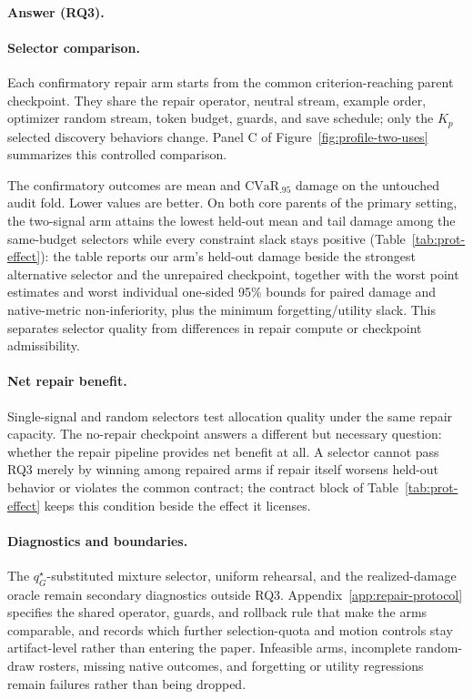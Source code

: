 \paragraph{Answer (RQ3).}
{\setlength{\emergencystretch}{3em}\ProtectionHeadline\par}

\paragraph{Selector comparison.}
Each confirmatory repair arm starts from the common criterion-reaching parent
checkpoint. They share the repair operator, neutral stream, example order,
optimizer random stream, token budget, guards, and save schedule; only the
$K_p$ selected discovery behaviors change. Panel C of
Figure~\ref{fig:profile-two-uses} summarizes this controlled comparison.

The confirmatory outcomes are mean and $\mathrm{CVaR}_{.95}$ damage on the
untouched audit fold. Lower values are better. On both core parents of the
primary setting, the two-signal arm attains the lowest held-out mean and
tail damage among the same-budget selectors while every constraint slack
stays positive (Table~\ref{tab:prot-effect}): the table reports our arm's
held-out damage beside the
strongest alternative selector and the unrepaired checkpoint, together with
the worst point estimates and worst individual one-sided 95\% bounds for paired
damage and native-metric non-inferiority, plus the minimum forgetting/utility
slack. This separates selector quality from
differences in repair compute or checkpoint admissibility.

\paragraph{Net repair benefit.}
Single-signal and random selectors test allocation quality under the same
repair capacity. The no-repair checkpoint answers a
different but necessary question: whether the repair pipeline provides net
benefit at all. A selector cannot pass RQ3 merely by winning among repaired
arms if repair itself worsens held-out behavior or violates the common
contract; the contract block of Table~\ref{tab:prot-effect} keeps this
condition beside the effect it licenses.

\paragraph{Diagnostics and boundaries.}
The $q_G^\star$-substituted mixture selector, uniform rehearsal, and the
realized-damage oracle remain secondary diagnostics outside RQ3.
Appendix~\ref{app:repair-protocol} specifies the shared operator, guards, and
rollback rule that make the arms comparable, and records which further
selection-quota and motion controls stay artifact-level rather than entering
the paper. Infeasible arms, incomplete random-draw
rosters, missing native outcomes, and forgetting or utility regressions remain
failures rather than being dropped.


